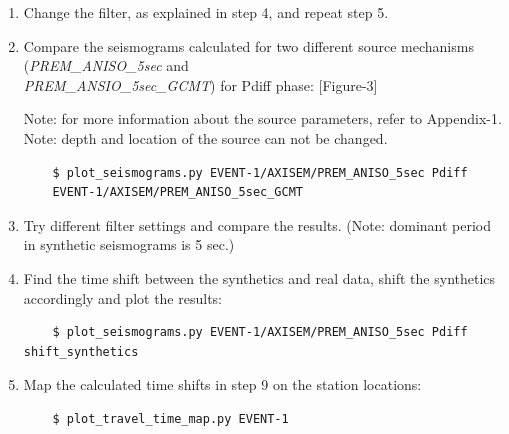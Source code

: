 \documentclass{article}
\begin{document}
\begin{enumerate}
    \item Change the filter, as explained in step 4, and repeat step 5.
    
    \item Compare the seismograms calculated for two different source mechanisms
    (\textit{PREM\_ANISO\_5sec} and \\ \textit{PREM\_ANSIO\_5sec\_GCMT}) for Pdiff phase: [Figure-3] 
    
    Note: for more information about the source parameters, refer to Appendix-1.\\
    Note: depth and location of the source can not be changed.
    \begin{verbatim}
    $ plot_seismograms.py EVENT-1/AXISEM/PREM_ANISO_5sec Pdiff 
    EVENT-1/AXISEM/PREM_ANISO_5sec_GCMT
    \end{verbatim}
    
    \item Try different filter settings and compare the results.
    (Note: dominant period in synthetic seismograms is 5 sec.)
    
    \item Find the time shift between the synthetics and real data, shift the synthetics
    accordingly and plot the results:
    
    \begin{verbatim}
    $ plot_seismograms.py EVENT-1/AXISEM/PREM_ANISO_5sec Pdiff shift_synthetics
    \end{verbatim}
    
    \item Map the calculated time shifts in step 9 on the station locations:
    
    \begin{verbatim}
    $ plot_travel_time_map.py EVENT-1
    \end{verbatim}

\end{enumerate}
\end{document}
